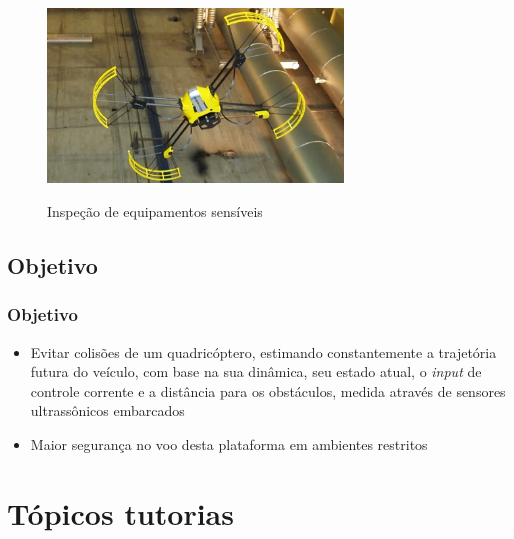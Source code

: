 \documentclass{beamer}
\begin{document}
\begin{frame}[allowframebreaks]
\begin{itemize}
	\framebreak
		\vspace{2cm}
		
		\begin{figure}
			\centering
			\includegraphics[keepaspectratio = true,
			width=0.7\textwidth]{img/Inspection-Drone.jpg}
			\label{fig:obr2013}
			\caption{Inspeção de equipamentos sensíveis}
		\end{figure}
			
	\end{itemize}	
\end{frame}

\subsection{Objetivo}
\label{objetivo}
\begin{frame}
	\frametitle{Objetivo}	
	
	\begin{itemize}
		\item Evitar colisões de um quadricóptero, estimando constantemente a trajetória futura do veículo, com base na sua dinâmica, seu estado atual, o \textit{input} de controle corrente e a distância para os obstáculos, medida através de sensores ultrassônicos embarcados
		 
		 \vspace{1cm}
		 
		 \item Maior segurança no voo desta plataforma em ambientes restritos
	\end{itemize} 
	 	
\end{frame}


\section{Tópicos tutorias}
\end{document}
